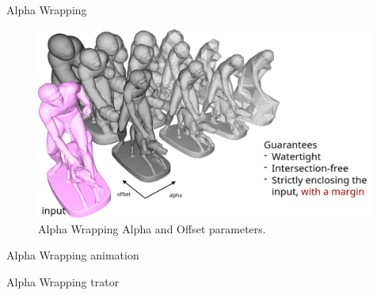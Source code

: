 \documentclass[10pt]{beamer}
\begin{document}
\begin{frame}{Alpha Wrapping}
  \begin{figure}[H]
    \centering
    \includegraphics[width=1.1\textwidth]{images/alpha-wrapping4.jpg}
    \caption{Alpha Wrapping Alpha and Offset parameters.}
\end{figure}
\end{frame}

\begin{frame}{Alpha Wrapping animation}
  \begin{center}
\end{center}
\end{frame}

\begin{frame}{Alpha Wrapping trator}
  \begin{center}
\end{center}
\end{frame}
\end{document}

